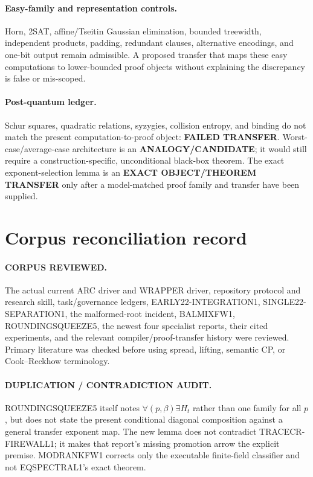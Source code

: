 \documentclass[11pt]{article}
\begin{document}
\paragraph{Easy-family and representation controls.}
Horn, 2SAT, affine/Tseitin Gaussian elimination, bounded treewidth,
independent products, padding, redundant clauses, alternative encodings,
and one-bit output remain admissible. A proposed transfer that maps these
easy computations to lower-bounded proof objects without explaining the
discrepancy is false or mis-scoped.

\paragraph{Post-quantum ledger.}
Schur squares, quadratic relations, syzygies, collision entropy, and binding
do not match the present computation-to-proof object: \textbf{FAILED
TRANSFER}. Worst-case/average-case architecture is an
\textbf{ANALOGY/CANDIDATE}; it would still require a construction-specific,
unconditional black-box theorem. The exact exponent-selection lemma is an
\textbf{EXACT OBJECT/THEOREM TRANSFER} only after a model-matched proof
family and transfer have been supplied.

\section{Corpus reconciliation record}
\paragraph{CORPUS REVIEWED.}
The actual current  ARC driver and  WRAPPER
driver, repository protocol and research skill, task/governance ledgers,
EARLY22-INTEGRATION1, SINGLE22-SEPARATION1, the malformed-root incident,
BALMIXFW1, ROUNDINGSQUEEZE5, the newest four specialist reports, their cited
experiments, and the relevant compiler/proof-transfer history were reviewed.
Primary literature was checked before using spread, lifting, semantic CP,
or Cook--Reckhow terminology.

\paragraph{DUPLICATION / CONTRADICTION AUDIT.}
ROUNDINGSQUEEZE5 itself notes $\forall(p,\beta)\exists H_t$ rather than one
family for all $p$, but does not state the present conditional diagonal
composition against a general transfer exponent map. The new lemma does not
contradict TRACECR-FIREWALL1; it makes that report's missing promotion arrow
the explicit premise. MODRANKFW1 corrects only the executable finite-field
classifier and not EQSPECTRAL1's exact theorem.
\end{document}
